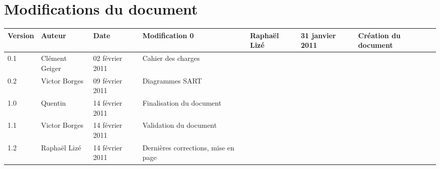 
\section*{Modifications du document}

\begin{center}
\begin{longtable}{|m{14mm}|m{36mm}|m{36mm}|m{60mm}|}
\hline
Version & Auteur & Date & Modification\endhead \hline
0
& %
Raphaël Lizé
& %
31 janvier 2011
& %
Création du document
\\\hline
0.1
& %
Clément Geiger
& %
02 février 2011
& %
Cahier des charges
\\\hline
0.2
& %
Victor Borges
& %
09 février 2011
& %
Diagrammes SART
\\\hline
1.0
& %
Quentin
& %
14 février 2011
& %
Finalisation du document
\\\hline
1.1
& %
Victor Borges
& %
14 février 2011
& %
Validation du document
\\\hline
1.2
& %
Raphaël Lizé
& %
14 février 2011
& %
Dernières corrections, mise en page
\\\hline

\end{longtable}
\end{center}

\pagebreak
